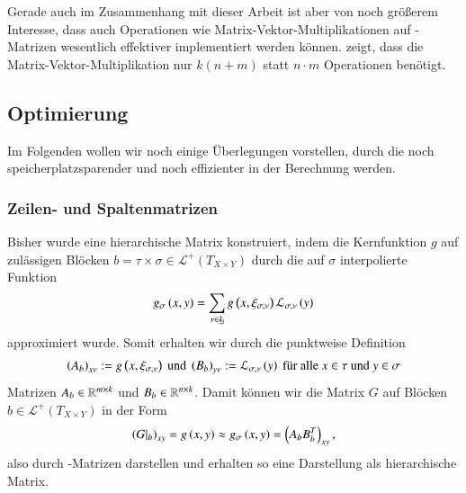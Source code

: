     Gerade auch im Zusammenhang mit dieser Arbeit ist aber von noch größerem Interesse, dass auch Operationen wie Matrix-Vektor-Multiplikationen auf \Rk-Matrizen wesentlich effektiver
    implementiert werden können. \citet{h2diss} zeigt, dass die Matrix-Vektor-Multiplikation nur $k\left(n+m\right)$ statt $n \cdot m$ Operationen benötigt.
    
    \subsection{Optimierung}
    \label{sek:optimierung}
    Im Folgenden wollen wir noch einige Überlegungen vorstellen, durch die \hmat noch speicherplatzsparender und noch effizienter in der Berechnung werden.
    
    \subsubsection{Zeilen- und Spaltenmatrizen}
    Bisher wurde eine hierarchische Matrix konstruiert, indem die Kernfunktion $g$ auf zulässigen Blöcken $b = \tau \times \sigma \in \mathcal{L}^+\left(T_{X \times Y}\right)$ durch die auf $\sigma$ 
    interpolierte Funktion
    \begin{equation*}
      g_\sigma\left(x, y\right) = \sum_{\nu \in \haken{k}} g\left(x, \xi_\inds{\nu}\right) \lag_\inds{\nu}\left(y\right)
    \end{equation*}
    approximiert wurde. Somit erhalten wir durch die punktweise Definition
    \begin{equation*}
      \left(A_b\right)_{x\nu} := g\left(x, \xi_{\sigma, \nu}\right) \text{ und } \left(B_b\right)_{y\nu} := \mathcal{L}_{\sigma, \nu}\left(y\right) \text{ für alle } x \in \tau \text{ und } y \in \sigma
    \end{equation*}
    Matrizen $A_b \in \mathbb{R}^{m \times k}$ und $B_b \in \mathbb{R}^{n \times k}$. Damit können wir die Matrix $G$ auf Blöcken $b \in \mathcal{L}^+\left(T_{X \times Y}\right)$ in der Form 
    \begin{equation*}
      \left(G|_b\right)_{xy} = g\left(x,y\right) \approx g_\sigma\left(x,y\right) = \left(A_b B_b^T\right)_{xy},
    \end{equation*}
    also durch \Rk-Matrizen darstellen und erhalten so eine Darstellung als hierarchische Matrix. \citep{nichtlokop}
    
